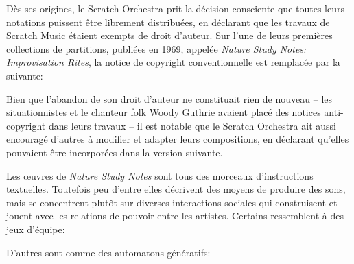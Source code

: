 {D\`es ses origines, le Scratch Orchestra prit la d\'ecision consciente
que toutes leurs notations puissent \^etre librement distribu\'ees, en
d\'eclarant que les travaux de Scratch Music \'etaient exempts de droit
d'auteur. Sur l'une de leurs premi\`eres collections
de partitions, publi\'ees en 1969, appel\'ee {\em Nature Study
Notes: Improvisation Rites}, la notice de copyright conventionnelle est
remplac\'ee par la suivante:


Bien que l'abandon de son droit d'auteur ne constituait
rien de nouveau {--} les situationnistes et le chanteur folk Woody
Guthrie avaient plac\'e des notices anti{}-copyright dans leurs travaux
{--} il est notable que le Scratch Orchestra ait aussi encourag\'e
d'autres \`a modifier et adapter leurs compositions, en d\'eclarant
qu'elles pouvaient \^etre incorpor\'ees dans la version suivante.


Les {\oe}uvres de {\em Nature Study Notes} sont tous des morceaux
d'instru\-ctions textuelles. Toutefois peu d'entre elles d\'ecrivent des
moyens de produire des sons, mais se concentrent plut\^ot sur diverses
interactions sociales qui construisent et jouent avec les relations de
pouvoir entre les artistes. Certains ressemblent \`a des jeux
d'\'equipe:


D'autres sont comme des automatons g\'en\'eratifs:


}
